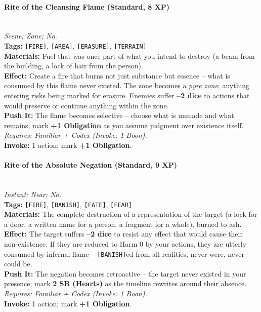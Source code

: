 \paragraph{Rite of the Cleansing Flame (Standard, 8 XP)} \hfill \\
\emph{Scene; Zone; No.} \\
\textbf{Tags:} \texttt{[FIRE]}, \texttt{[AREA]}, \texttt{[ERASURE]}, \texttt{[TERRAIN]} \\
\textbf{Materials:} Fuel that was once part of what you intend to destroy (a beam from the building, a lock of hair from the person). \\
\textbf{Effect:} Create a fire that burns not just substance but essence – what is consumed by this flame never existed. The zone becomes a \textit{pyre zone}; anything entering risks being marked for erasure. Enemies suffer \textbf{–2 dice} to actions that would preserve or continue anything within the zone. \\
\textbf{Push It:} The flame becomes selective – choose what is unmade and what remains; mark \textbf{+1 Obligation} as you assume judgment over existence itself. \\
\emph{Requires: Familiar + Codex (\textit{Invoke:} 1 Boon).} \\
\textbf{Invoke:} 1 action; mark \textbf{+1 Obligation}.

\paragraph{Rite of the Absolute Negation (Standard, 9 XP)} \hfill \\
\emph{Instant; Near; No.} \\
\textbf{Tags:} \texttt{[FIRE]}, \texttt{[BANISH]}, \texttt{[FATE]}, \texttt{[FEAR]} \\
\textbf{Materials:} The complete destruction of a representation of the target (a lock for a door, a written name for a person, a fragment for a whole), burned to ash. \\
\textbf{Effect:} The target suffers \textbf{–2 dice} to resist any effect that would cause their non‑existence. If they are reduced to Harm 0 by your actions, they are utterly consumed by infernal flame – \texttt{[BANISH]}ed from all realities, never were, never could be. \\
\textbf{Push It:} The negation becomes retroactive – the target never existed in your presence; mark \textbf{2 SB (Hearts)} as the timeline rewrites around their absence. \\
\emph{Requires: Familiar + Codex (\textit{Invoke:} 1 Boon).} \\
\textbf{Invoke:} 1 action; mark \textbf{+1 Obligation}.

